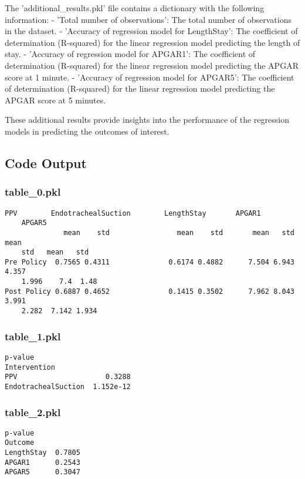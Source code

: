 \documentclass[11pt]{article}
\begin{document}
The 'additional\_results.pkl' file contains a dictionary with the following information:
- 'Total number of observations': The total number of observations in the dataset.
- 'Accuracy of regression model for LengthStay': The coefficient of determination (R-squared) for the linear regression model predicting the length of stay.
- 'Accuracy of regression model for APGAR1': The coefficient of determination (R-squared) for the linear regression model predicting the APGAR score at 1 minute.
- 'Accuracy of regression model for APGAR5': The coefficient of determination (R-squared) for the linear regression model predicting the APGAR score at 5 minutes.

These additional results provide insights into the performance of the regression models in predicting the outcomes of interest.

\subsection{Code Output}

\subsubsection*{table\_0.pkl}

\begin{Verbatim}[tabsize=4]
               PPV        EndotrachealSuction        LengthStay       APGAR1
	APGAR5
              mean    std                mean    std       mean   std   mean
	std   mean   std
Pre Policy  0.7565 0.4311              0.6174 0.4882      7.504 6.943  4.357
	1.996    7.4  1.48
Post Policy 0.6887 0.4652              0.1415 0.3502      7.962 8.043  3.991
	2.282  7.142 1.934
\end{Verbatim}

\subsubsection*{table\_1.pkl}

\begin{Verbatim}[tabsize=4]
                       p-value
Intervention
PPV                     0.3288
EndotrachealSuction  1.152e-12
\end{Verbatim}

\subsubsection*{table\_2.pkl}

\begin{Verbatim}[tabsize=4]
           p-value
Outcome
LengthStay  0.7805
APGAR1      0.2543
APGAR5      0.3047
\end{Verbatim}
\end{document}
